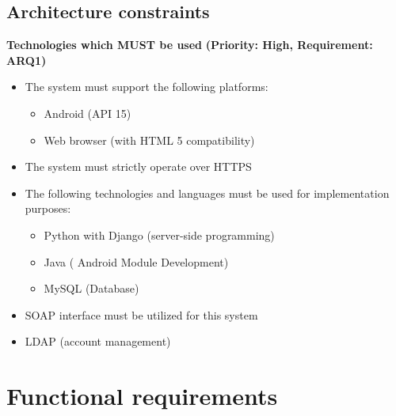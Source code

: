 \documentclass[12pt]{article}
\begin{document}
	
			\vspace{0.2in}			
			
			
		
		\subsection{Architecture constraints}
	
		\vspace{0.2in}
		
		\begin{flushleft}
				\textbf{Technologies which MUST be used}
				\newline\textbf{(Priority: High, Requirement: ARQ1)}
		\end{flushleft}
			
			\vspace{0.05in}
		\begin{itemize}
					\item The system must support the following platforms: 
						\begin{itemize}
							\item Android (API 15)
							\item Web browser (with HTML 5 compatibility)
						\end{itemize}
						
					\item The system must strictly operate over HTTPS
					\item The following technologies and languages must be used for implementation purposes:
						\begin{itemize}
							\item Python with Django (server-side programming)
							\item Java ( Android Module Development)
							\item MySQL (Database)
						\end{itemize}
						\item SOAP interface must be utilized for this system
						\item LDAP (account management)
		\end{itemize}
		
		\vspace{0.05in}
		
	
	\section{Functional requirements}
	
		\vspace{0.2in}
		
\end{document}

